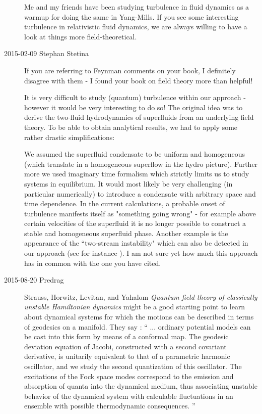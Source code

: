 \begin{description}
Me and my friends have been studying turbulence in fluid dynamics as a
warmup for doing the same in Yang-Mills. If you see some interesting
turbulence in relativistic fluid dynamics, we are always willing to have
a look at things more field-theoretical.

\item[2015-02-09 Stephan Stetina]
If you are referring to Feynman comments on your book, I definitely disagree
with them - I found your book on field theory more than helpful!

It is very difficult to study (quantum) turbulence within our approach -
however it would be very interesting to do so! The original idea was to
derive the two-fluid hydrodynamics of superfluids from an underlying
field theory. To be able to obtain analytical results, we had to apply
some rather drastic simplifications:

We assumed the superfluid condensate to be uniform and homogeneous (which
translate in a homogeneous superflow in the hydro picture). Further more
we used imaginary time formalism which strictly limits us to study
systems in equilibrium. It would most likely be very challenging (in
particular numerically) to introduce a condensate with arbitrary space
and time dependence. In the current calculations, a probable onset of
turbulence manifests itself as "something going wrong" - for example
above certain velocities of the superfluid it is no longer possible to
construct a stable and homogeneous superfluid phase. Another example is
the appearance of the ``two-stream instability" which can also be detected
in our approach (see for instance ).
I am not sure yet how much this approach has in common with the one you
have cited.

\item[2015-08-20 Predrag]
Strauss, Horwitz, Levitan, and Yahalom
{\em Quantum field theory of classically unstable {Hamiltonian} dynamics}
might be a good starting point to learn about dynamical systems for which
the motions can be described in terms of geodesics on a manifold. They
say : ``
... ordinary potential models can be cast into this form by means of a
conformal map. The geodesic deviation equation of Jacobi, constructed
with a second covariant derivative, is unitarily equivalent to that of a
parametric harmonic oscillator, and we study the second quantization of
this oscillator. The excitations of the Fock space modes correspond to
the emission and absorption of quanta into the dynamical medium, thus
associating unstable behavior of the dynamical system with calculable
fluctuations in an ensemble with possible thermodynamic consequences.
''


\end{description}
